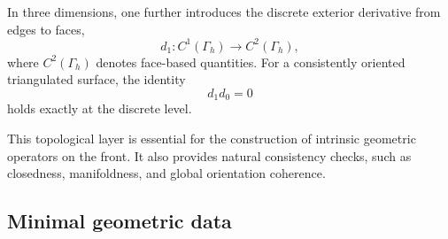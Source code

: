 \documentclass{article}
\begin{document}
In three dimensions, one further introduces the discrete exterior derivative from
edges to faces,
\begin{equation}
d_1 : C^1(\Gamma_h) \longrightarrow C^2(\Gamma_h),
\end{equation}
where $C^2(\Gamma_h)$ denotes face-based quantities.
For a consistently oriented triangulated surface, the identity
\begin{equation}
d_1 d_0 = 0
\label{eq:exact_sequence}
\end{equation}
holds exactly at the discrete level.

This topological layer is essential for the construction of intrinsic geometric
operators on the front. It also provides natural consistency checks, such as
closedness, manifoldness, and global orientation coherence.

\subsection{Minimal geometric data}
\label{subsec:front_geometry}
\end{document}
